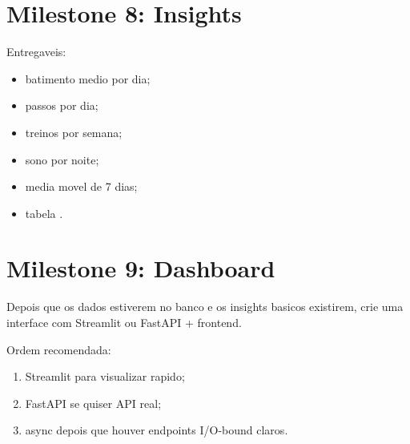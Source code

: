\section{Milestone 8: Insights}

Entregaveis:

\begin{itemize}
  \item batimento medio por dia;
  \item passos por dia;
  \item treinos por semana;
  \item sono por noite;
  \item media movel de 7 dias;
  \item tabela .
\end{itemize}

\section{Milestone 9: Dashboard}

Depois que os dados estiverem no banco e os insights basicos existirem, crie uma interface com Streamlit ou FastAPI + frontend.

Ordem recomendada:

\begin{enumerate}
  \item Streamlit para visualizar rapido;
  \item FastAPI se quiser API real;
  \item async depois que houver endpoints I/O-bound claros.
\end{enumerate}
